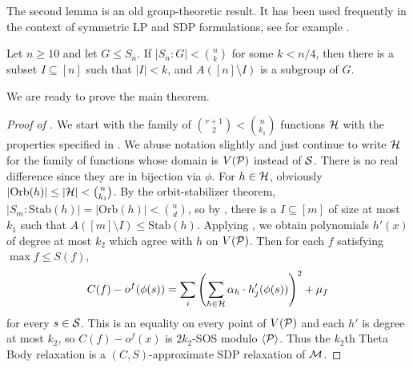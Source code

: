 The second lemma is an old group-theoretic result. It has been used frequently in the context of symmetric LP and SDP formulations, see for example \cite{LRST14,KPT10,BFPS12}. 
\begin{lemma}\label{lem:dixandmort}
Let $n \geq 10$ and let $G \leq S_n$. If $|S_n: G| < \binom{n}{k}$ for some $k < n/4$, then there is a subset $I \subseteq [n]$ such that $|I| < k$, and $A([n] \setminus I)$ is a subgroup of $G$.
\end{lemma}
We are ready to prove the main theorem.
\begin{proof}[Proof of ]
We start with the family of $\binom{r+1}{2} < \binom{n}{k_1}$ functions $\mathcal H$ with the properties specified in . We abuse notation slightly and just continue to write $\mathcal H$ for the family of functions whose domain is $V(\mathcal P)$ instead of $\mathcal S$. There is no real difference since they are in bijection via $\phi$. For $h \in \mathcal H$, obviously $|\text{Orb}(h)| \leq |\mathcal H| < \binom{n}{k_1}$. By the orbit-stabilizer theorem, $|S_m : \text{Stab}(h)| = |\text{Orb}(h)| < \binom{n}{d}$, so by , there is a $I \subseteq [m]$ of size at most $k_1$ such that $A([m] \setminus I) \leq \text{Stab}(h)$. Applying , we obtain polynomials $h'(x)$ of degree at most $k_2$ which agree with $h$ on $V(\mathcal P)$. Then for each $f$ satisfying $\max f \leq S(f)$,
\[C(f) - o^f(\phi(s)) = \sum_i \left(\sum_{h \in \mathcal H} \alpha_h \cdot h'_j(\phi(s))\right)^2 + \mu_f\]
for every $s \in \mathcal S$. This is an equality on every point of $V(\mathcal P)$ and each $h'$ is degree at most $k_2$, so $C(f) - o^f(x)$ is $2k_2$-SOS modulo $\langle \mathcal P \rangle$. Thus the $k_2$th Theta Body relaxation is a $(C,S)$-approximate SDP relaxation of $\mathcal M$. 
\end{proof}

